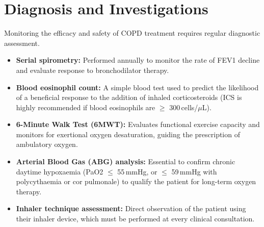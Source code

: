 \section*{Diagnosis and Investigations}
Monitoring the efficacy and safety of COPD treatment requires regular diagnostic assessment.
\begin{itemize}
    \item \textbf{Serial spirometry:} Performed annually to monitor the rate of FEV1 decline and evaluate response to bronchodilator therapy.
    \item \textbf{Blood eosinophil count:} A simple blood test used to predict the likelihood of a beneficial response to the addition of inhaled corticosteroids (ICS is highly recommended if blood eosinophils are $\ge$ 300\,cells/$\mu$L).
    \item \textbf{6-Minute Walk Test (6MWT):} Evaluates functional exercise capacity and monitors for exertional oxygen desaturation, guiding the prescription of ambulatory oxygen.
    \item \textbf{Arterial Blood Gas (ABG) analysis:} Essential to confirm chronic daytime hypoxaemia (PaO2 $\le$ 55\,mmHg, or $\le$ 59\,mmHg with polycythaemia or cor pulmonale) to qualify the patient for long-term oxygen therapy.
    \item \textbf{Inhaler technique assessment:} Direct observation of the patient using their inhaler device, which must be performed at every clinical consultation.
\end{itemize}

